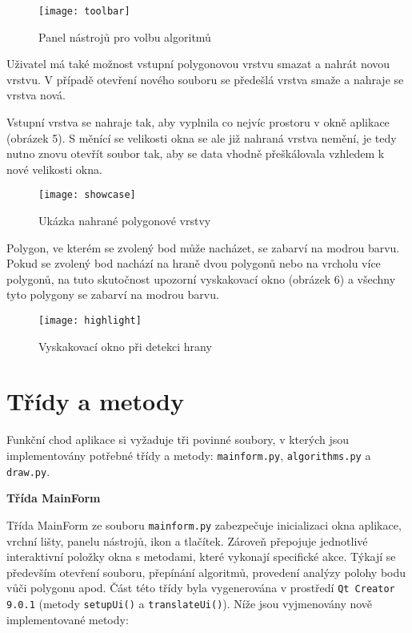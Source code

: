 \begin{figure}[h]
    \centering
        \texttt{[image: toolbar]} 
        \caption{Panel nástrojů pro volbu algoritmů}
\end{figure}

\par Uživatel má také možnost vstupní polygonovou vrstvu smazat a nahrát novou vrstvu. V případě otevření nového souboru se předešlá vrstva smaže a nahraje se vrstva nová.
\par Vstupní vrstva se nahraje tak, aby vyplnila co nejvíc prostoru v okně aplikace (obrázek 5). S měnící se velikosti okna se ale již nahraná vrstva nemění, je tedy nutno znovu otevřít soubor tak, aby se data vhodně přeškálovala vzhledem k nové velikosti okna. 

\begin{figure}[h]
    \centering
        \texttt{[image: showcase]} 
        \caption{Ukázka nahrané polygonové vrstvy}
\end{figure}
\par Polygon, ve kterém se zvolený bod může nacházet, se zabarví na modrou barvu. Pokud se zvolený bod nachází na hraně dvou polygonů nebo na vrcholu více polygonů, na tuto skutočnost upozorní vyskakovací okno (obrázek 6) a všechny tyto polygony se zabarví na modrou barvu.

\begin{figure}[h]
    \centering
        \texttt{[image: highlight]} 
        \caption{Vyskakovací okno při detekci hrany}
\end{figure}

\bigbreak

\newpage
\section*{Třídy a metody}
\par Funkční chod aplikace si vyžaduje tři povinné soubory, v kterých jsou implementovány potřebné třídy a metody: \verb|mainform.py|, \verb|algorithms.py| a \verb|draw.py|.

\bigbreak

\par {\large\textbf{Třída MainForm} }
\par Třída MainForm ze souboru \verb|mainform.py| zabezpečuje inicializaci okna aplikace, vrchní lišty, panelu nástrojů, ikon a tlačítek. Zároveň přepojuje jednotlivé interaktivní položky okna s metodami, které vykonají specifické akce. Týkají se především otevření souboru, přepínání algoritmů, provedení analýzy polohy bodu vůči polygonu apod. Část této třídy byla vygenerována v prostředí \verb|Qt Creator 9.0.1| (metody \verb|setupUi()| a \verb|translateUi()|). Níže jsou vyjmenovány nově implementované metody:

